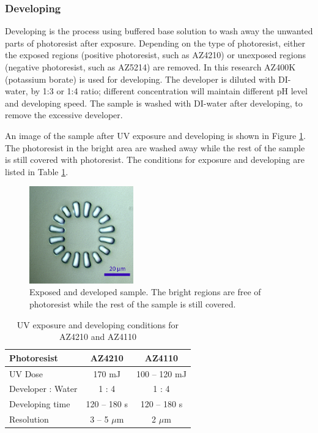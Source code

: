 \documentclass[pdflatex, sectionletters, 12pt, final, phd]{pittetd}    %
\begin{document}
\subsubsection{Developing}

Developing is the process using buffered base solution to wash away the unwanted parts of photoresist after exposure. Depending on the type of photoresist, either the exposed regions (positive photoresist, such as AZ4210) or unexposed regions (negative photoresist, such as AZ5214) are removed. In this research AZ400K (potassium borate) is used for developing. The developer is diluted with DI-water, by 1:3 or 1:4 ratio; different concentration will maintain different pH level and developing speed. The sample is washed with DI-water after developing, to remove the excessive developer. 

An image of the sample after UV exposure and developing is shown in Figure \ref{FIG:Developed}. The photoresist in the bright area are washed away while the rest of the sample is still covered with photoresist. The conditions for exposure and developing are listed in Table \ref{TAB:photoresistsExposureDeveloping}.

\begin{figure}[h!]
	\centering
	\vspace{0.85cm}
	\includegraphics[width=0.4\textwidth]{Drawing/Developed.png}
	\caption[Exposed and developed sample]{Exposed and developed sample. The bright regions are free of photoresist while the rest of the sample is still covered.}
	\label{FIG:Developed}
\end{figure}

\begin{table}[h!]
	\centering
	\vspace{0.85cm}
	\begin{tabular}{l|cc}
		\hline
		Photoresist    &    AZ4210    &    AZ4110 \\ \hline
		UV Dose    &    170 mJ    & 100 -- 120 mJ    \\ 
		Developer : Water    &    1 : 4    &    1 : 4    \\
		Developing time    &    120 -- 180 s    &    120 -- 180 s \\ 
		Resolution    &    3 -- 5 $\mu$m    &    2 $\mu$m    \\ \hline
	\end{tabular}
	\caption{UV exposure and developing conditions for AZ4210 and AZ4110}
	\label{TAB:photoresistsExposureDeveloping}    
\end{table}
\end{document}
